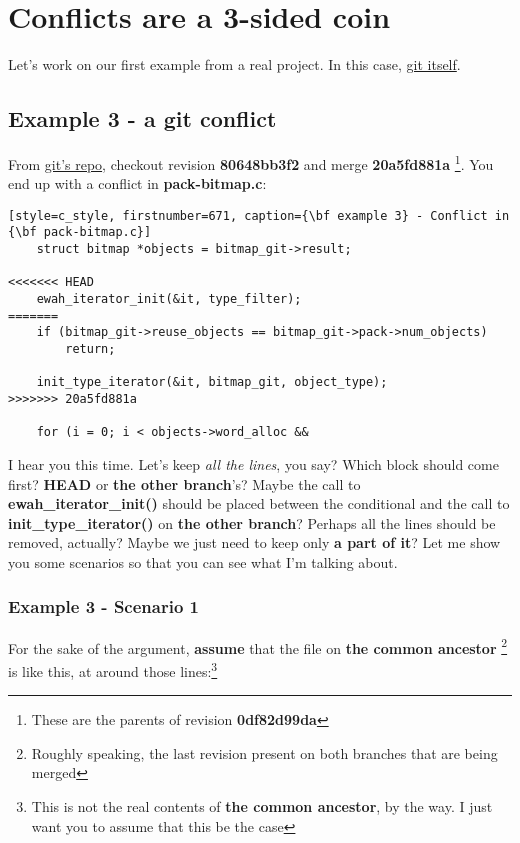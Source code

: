 
\section{Conflicts are a 3-sided coin}

Let's work on our first example from a real project. In this case, \hyperref[git_repo]{git itself}.

\subsection{Example 3 - a git conflict}
\label{example_03}

From \hyperref[git_repo]{git's repo}, checkout revision {\bf 80648bb3f2} and merge {\bf 20a5fd881a} \footnote{These
are the parents of revision {\bf 0df82d99da}}. You end up with a conflict in {\bf pack-bitmap.c}:
\begin{lstlisting}[style=c_style, firstnumber=671, caption={\bf example 3} - Conflict in {\bf pack-bitmap.c}]
	struct bitmap *objects = bitmap_git->result;

<<<<<<< HEAD
	ewah_iterator_init(&it, type_filter);
=======
	if (bitmap_git->reuse_objects == bitmap_git->pack->num_objects)
		return;

	init_type_iterator(&it, bitmap_git, object_type);
>>>>>>> 20a5fd881a

	for (i = 0; i < objects->word_alloc &&
\end{lstlisting}

I hear you this time. Let's keep {\it all the lines}, you say? Which block should come first? {\bf HEAD} or
{\bf the other branch}'s? Maybe the call to {\bf ewah\_iterator\_init()} should be placed between the conditional and
the call to {\bf init\_type\_iterator()} on {\bf the other branch}? Perhaps all the lines should be removed, actually?
Maybe we just need to keep only {\bf a part of it}? Let me show you some scenarios so that you can see what I'm talking about.

\subsubsection{Example 3 - Scenario 1}
For the sake of the argument, {\bf assume} that the file on {\bf the common ancestor} \footnote{Roughly speaking, the last revision
present on both branches that are being merged} is like this, at around those lines:\footnote{This is not the real contents
of {\bf the common ancestor}, by the way. I just want you to assume that this be the case}

